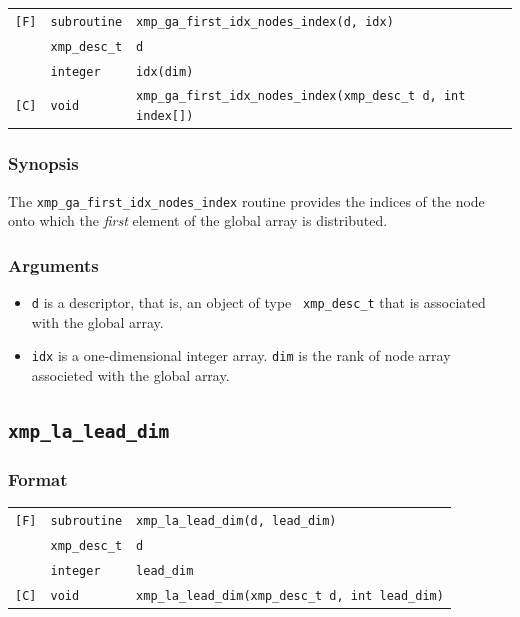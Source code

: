 \begin{tabular}{lll}

\verb![F]!&  {\tt subroutine}& {\tt xmp\_ga\_first\_idx\_nodes\_index(d, idx)}\\
          & {\tt xmp\_desc\_t} & {\tt d}\\
          & {\tt integer} & {\tt idx(dim)}\\

\verb![C]!&  {\tt void}& {\tt xmp\_ga\_first\_idx\_nodes\_index(xmp\_desc\_t d, int index[])}\\

\end{tabular}

\subsubsection*{Synopsis}

The {\tt xmp\_ga\_first\_idx\_nodes\_index} routine provides the indices
of the node onto which the {\it first} element of the global array is
distributed.

\subsubsection*{Arguments}

\begin{itemize}
 \item {\tt d} is a descriptor, that is, an object of type {\tt
       xmp\_desc\_t} that is associated with the global array.
 \item {\tt idx} is a one-dimensional integer array. {\tt dim} is the
       rank of node array associeted with the global array.
\end{itemize}


\subsection{\tt xmp\_la\_lead\_dim}

\subsubsection*{Format}

\begin{tabular}{lll}

\verb![F]!&  {\tt subroutine}& {\tt xmp\_la\_lead\_dim(d, lead\_dim)}\\
          & {\tt xmp\_desc\_t} & {\tt d}\\
          & {\tt integer} & {\tt lead\_dim}\\

\verb![C]!&  {\tt void}& {\tt xmp\_la\_lead\_dim(xmp\_desc\_t d, int lead\_dim)}\\

\end{tabular}

